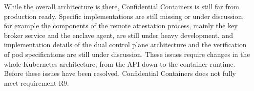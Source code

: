 While the overall architecture is there, Confidential Containers is still far
from production ready. Specific implementations are still missing or under
discussion, for example the components of the remote attestation process, mainly
the key broker service and the enclave agent, are still under heavy development,
and implementation details of the dual control plane architecture and the
verification of pod specifications are still under discussion. These issues
require changes in the whole Kubernetes architecture, from the API down to the
container runtime. Before these issues have been resolved, Confidential
Containers does not fully meet requirement R9.
